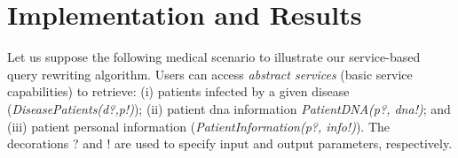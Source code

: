 \section{Implementation and Results}
\label{sec:implementationandresults}  
Let us suppose the following medical scenario to illustrate our service-based query rewriting algorithm. 
Users can access \textit{abstract services} (basic service capabilities) to retrieve: (i) patients infected by a given disease (\textit{DiseasePatients(d?,p!)});
(ii) patient dna information \textit{PatientDNA(p?, dna!)}; and (iii) patient personal information (\textit{PatientInformation(p?, info!)}).
The decorations ? and ! are used to specify input and output parameters, respectively. 


% 

